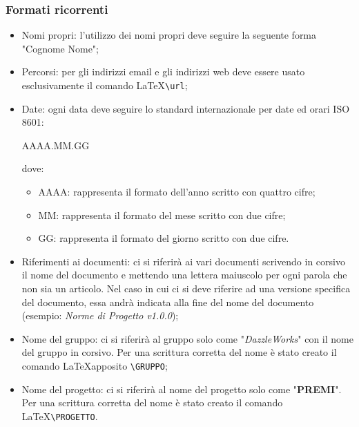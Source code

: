 \subsubsection{Formati ricorrenti}
\begin{itemize}
	\item Nomi propri: l'utilizzo dei nomi propri deve seguire la seguente forma "Cognome Nome";
	\item Percorsi: per gli indirizzi email e gli indirizzi web deve essere usato esclusivamente il comando \LaTeX  \verb|\url|;
	\item Date:  ogni data deve seguire lo standard internazionale per date ed orari ISO 8601:
	\begin{center}
		AAAA.MM.GG
	\end{center}
	dove:
	\begin{itemize}
		\item AAAA: rappresenta il formato dell'anno scritto con quattro cifre;
		\item MM: rappresenta il formato del mese scritto con due cifre;
		\item GG: rappresenta il formato del giorno scritto con due cifre.
	\end{itemize}
	\item Riferimenti ai documenti: ci si riferirà ai vari documenti scrivendo in corsivo il nome del documento e mettendo una lettera maiuscolo per ogni parola che non sia un articolo. Nel caso in cui ci si deve riferire ad una versione specifica del documento, essa andrà indicata alla fine  del nome del documento (esempio: \textit{Norme di Progetto v1.0.0});
	\item Nome del gruppo: ci si riferirà al gruppo solo come "\textit{DazzleWorks}" con il nome del gruppo in corsivo. Per una scrittura corretta del nome è stato creato il comando \LaTeX apposito \verb|\GRUPPO|;
	\item Nome del progetto: ci si riferirà al nome del progetto solo come "\textbf{PREMI}". Per una scrittura corretta del nome è stato creato il comando \LaTeX \verb|\PROGETTO|.
\end{itemize}

